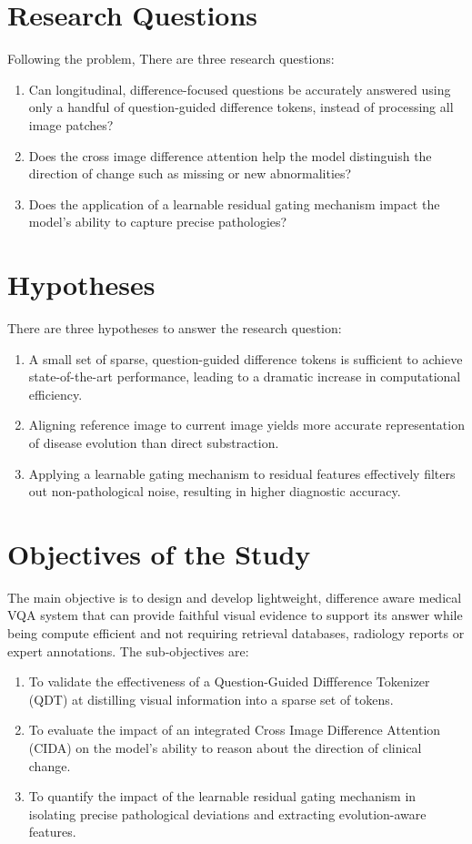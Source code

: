 \section{Research Questions}
Following the problem, There are three research questions:
\begin{enumerate}
    \item Can longitudinal, difference-focused questions be accurately answered using only a handful of question-guided difference tokens, instead of processing all image patches?
    \item Does the cross image difference attention help the model distinguish the direction of change such as missing or new abnormalities?
    \item Does the application of a learnable residual gating mechanism impact the model's ability to capture precise pathologies?
\end{enumerate}

\section{Hypotheses}
There are three hypotheses to answer the research question:
\begin{enumerate}
    \item A small set of sparse, question-guided difference tokens is sufficient to achieve state-of-the-art performance, leading to a dramatic increase in computational efficiency.
    \item Aligning reference image to current image yields more accurate representation of disease evolution than direct substraction.
    \item Applying a learnable gating mechanism to residual features effectively filters out non-pathological noise, resulting in higher diagnostic accuracy.
\end{enumerate}

\section{Objectives of the Study}
The main objective is to design and develop lightweight, difference aware medical VQA system that can provide faithful visual evidence to support its answer while being compute efficient and not requiring retrieval databases, radiology reports or expert annotations. The sub-objectives are:

\begin{enumerate}
    \item To validate the effectiveness of a Question-Guided Diffference Tokenizer (QDT) at distilling visual information into a sparse set of tokens.
    \item To evaluate the impact of an integrated Cross Image Difference Attention (CIDA) on the model's ability to reason about the direction of clinical change.
    \item To quantify the impact of the learnable residual gating mechanism in isolating precise pathological deviations and extracting evolution-aware features.
\end{enumerate}

